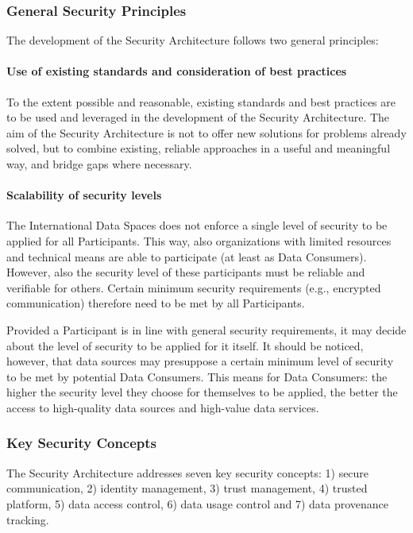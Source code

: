 \subsubsection{General Security Principles}
The development of the Security Architecture follows two general principles:

\paragraph*{Use of existing standards and consideration of best practices\\}

To the extent possible and reasonable, existing standards and best practices are to be used and leveraged in the development of the Security Architecture. The aim of the Security Architecture is not to offer new solutions for problems already solved, but to combine existing, reliable approaches in a useful and meaningful way, and bridge gaps where necessary.

\paragraph*{Scalability of security levels\\}

The International Data Spaces does not enforce a single level of security to be applied for all Participants. This way, also organizations with limited resources and technical means are able to participate (at least as Data Consumers). However, also the security level of these participants must be reliable and verifiable for others. Certain minimum security requirements (e.g., encrypted communication) therefore need to be met by all Participants.

Provided a Participant is in line with general security requirements, it may decide about the level of security to be applied for it itself. It should be noticed, however, that data sources may presuppose a certain minimum level of security to be met by potential Data Consumers. This means for Data Consumers: the higher the security level they choose for themselves to be applied, the better the access to high-quality data sources and high-value data services.

\subsubsection{Key Security Concepts}
The Security Architecture addresses seven key security concepts: 1) secure communication, 2) identity management, 3) trust management, 4) trusted platform, 5) data access control, 6) data usage control and 7) data provenance tracking. 

